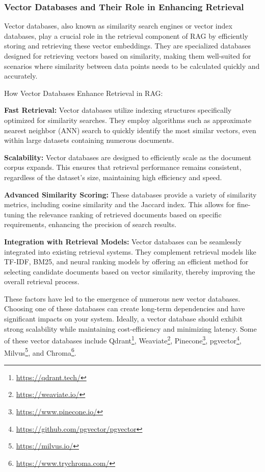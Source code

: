 \subsubsection*{Vector Databases and Their Role in Enhancing Retrieval}

Vector databases, also known as similarity search engines or vector index databases, play a crucial role in the retrieval component of RAG by efficiently storing and retrieving these vector embeddings. They are specialized databases designed for retrieving vectors based on similarity, making them well-suited for scenarios where similarity between data points needs to be calculated quickly and accurately.

How Vector Databases Enhance Retrieval in RAG:

\textbf{Fast Retrieval:} Vector databases utilize indexing structures specifically optimized for similarity searches. They employ algorithms such as approximate nearest neighbor (ANN) search to quickly identify the most similar vectors, even within large datasets containing numerous documents.

\textbf{Scalability:} Vector databases are designed to efficiently scale as the document corpus expands. This ensures that retrieval performance remains consistent, regardless of the dataset's size, maintaining high efficiency and speed.

\textbf{Advanced Similarity Scoring:} These databases provide a variety of similarity metrics, including cosine similarity and the Jaccard index. This allows for fine-tuning the relevance ranking of retrieved documents based on specific requirements, enhancing the precision of search results.

\textbf{Integration with Retrieval Models:} Vector databases can be seamlessly integrated into existing retrieval systems. They complement retrieval models like TF-IDF, BM25, and neural ranking models by offering an efficient method for selecting candidate documents based on vector similarity, thereby improving the overall retrieval process.

These factors have led to the emergence of numerous new vector databases. Choosing one of these databases can create long-term dependencies and have significant impacts on your system. Ideally, a vector database should exhibit strong scalability while maintaining cost-efficiency and minimizing latency. Some of these vector databases include Qdrant\footnote{\url{https://qdrant.tech/}}, Weaviate\footnote{\url{https://weaviate.io/}}, Pinecone\footnote{\url{https://www.pinecone.io/}}, pgvector\footnote{\url{https://github.com/pgvector/pgvector}}, Milvus\footnote{\url{https://milvus.io/}}, and Chroma\footnote{\url{https://www.trychroma.com/}}.


